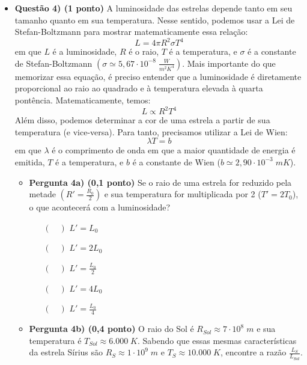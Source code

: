 \documentclass[a4paper, 12pt]{article}
\begin{document}
\begin{flushleft}
\begin{itemize}
		\item \textbf{Questão 4) (1 ponto)} A luminosidade das estrelas depende tanto em seu tamanho quanto em sua temperatura. Nesse sentido, podemos usar a Lei de Stefan-Boltzmann para mostrar matematicamente essa relação:
			$$L=4 \pi R^2 \sigma T^4$$
			em que $L$ é a luminosidade, $R$ é o raio, $T$ é a temperatura, e $\sigma$ é a constante de Stefan-Boltzmann $\left( \sigma \simeq 5,67 \cdot 10^{-8} \; \frac{W}{m^2K^4} \right)$. \linebreak \linebreak
			Mais importante do que memorizar essa equação, é preciso entender que a luminosidade é diretamente proporcional ao raio ao quadrado e à temperatura elevada à quarta pontência. Matematicamente, temos:
				$$L \propto R^2 T^4$$
			Além disso, podemos determinar a cor de uma estrela a partir de sua temperatura (e vice-versa). Para tanto, precisamos utilizar a Lei de Wien:
				$$\lambda T = b$$
				em que $\lambda$ é o comprimento de onda em que a maior quantidade de energia é emitida, $T$ é a temperatura, e $b$ é a constante de Wien ($b \simeq 2,90 \cdot 10^{-3} \; mK$). \linebreak \linebreak
				\begin{itemize}
					\item \textbf{Pergunta 4a) (0,1 ponto)} Se o raio de uma estrela for reduzido pela metade $\left( R'=\frac{R_0}{2} \right)$ e sua temperatura for multiplicada por 2 ($T'=2T_0$), o que acontecerá com a luminosidade?
						\begin{itemize}
							\item[$(\quad)$] $L'=L_0$
							\item[$(\quad)$] $L'=2L_0$
							\item[$(\quad)$] $L'=\frac{L_0}{2}$
							\item[$(\quad)$] $L'=4L_0$
							\item[$(\quad)$] $L'=\frac{L_0}{4}$
						\end{itemize}
					\item \textbf{Pergunta 4b) (0,4 ponto)} O raio do Sol é $R_{Sol} \approx 7 \cdot 10^8 \; m$ e sua temperatura é $T_{Sol} \approx 6.000 \; K$. Sabendo que essas mesmas características da estrela Sírius são $R_S \approx 1 \cdot 10^9 \; m$ e $T_S \approx 10.000 \; K$, encontre a razão $\frac{L_S}{L_{Sol}}$.
						\linebreak \linebreak \linebreak \linebreak \linebreak \linebreak \linebreak \linebreak \linebreak

\end{itemize}
\end{itemize}
\end{flushleft}
\end{document}
